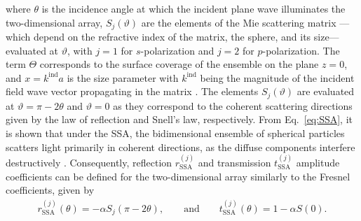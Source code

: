 %
where $\theta$ is the incidence angle at which the incident plane wave illuminates the two-dimensional array, $S_j(\vartheta)$ are the elements of the Mie scattering matrix \cite{bohren_absorption_1983} ---which depend on the refractive index of the matrix, the sphere, and its size--- evaluated at $\vartheta$, with $j=1$ for $s$-polarization and $j=2$ for $p$-polarization. The term $\Theta$ corresponds to the surface coverage of the ensemble on the plane $z=0$, and $x = k^\text{ind}a$ is the size parameter with $k^\text{ind}$ being the magnitude of the incident field wave vector propagating in the matrix \cite{barrera_coherent_2003,garcia2012multiple}. The elements $S_j(\vartheta)$ are evaluated at $\vartheta = \pi-2\theta$ and $\vartheta = 0$ as they correspond to the coherent scattering directions given by the law of reflection and Snell’s law, respectively. From Eq.~\eqref{eq:SSA}, it is shown that under the SSA, the bidimensional ensemble of spherical particles scatters light primarily in coherent directions, as the diffuse components interfere destructively \cite{barrera_coherent_2003}. Consequently, reflection $r^{(j)}_\text{SSA}$ and transmission $t^{(j)}_\text{SSA}$ amplitude coefficients can be defined for the two-dimensional array similarly to the Fresnel coefficients, given by
%
\begin{align}
	r^{(j)}_\text{SSA}(\theta) = -\alpha   S_j(\pi-2\theta), \qquad\text{and}\qquad t^{(j)}_\text{SSA}(\theta) = 1 - \alpha S(0).
\end{align}%
%

